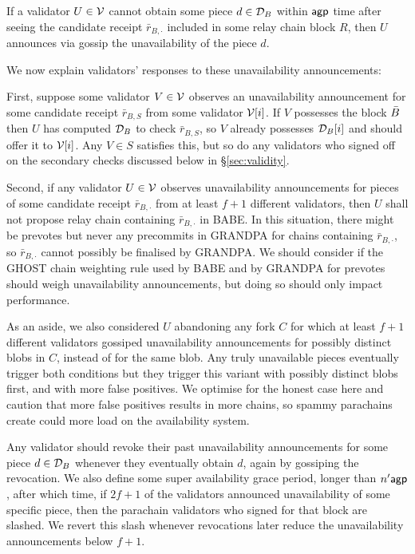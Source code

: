If a validator $U \in \mathcal{V}$ cannot obtain some piece $d \in \mathcal{D}_B$ within $\mathsf{agp}$ time after seeing the candidate receipt $\bar{r}_{B,\cdot}$ included in some relay chain block $R$, then $U$ announces via gossip the unavailability of the piece $d$. 

We now explain validators' responses to these unavailability announcements:

First, suppose some validator $V \in \mathcal{V}$ observes an unavailability announcement for some candidate receipt $\bar{r}_{B,S}$ from some validator $\mathcal{V}[i]$.  If $V$ possesses the block $\bar{B}$ then $U$ has computed $\mathcal{D}_B$ to check $\bar{r}_{B,S}$, so $V$ already possesses $\mathcal{D}_B[i]$ and should offer it to $\mathcal{V}[i]$.  Any $V \in S$ satisfies this, but so do any validators who signed off on the secondary checks discussed below in \S\ref{sec:validity}. 

Second, if any validator $U \in \mathcal{V}$ observes unavailability announcements for pieces of some candidate receipt $\bar{r}_{B,\cdot}$ from at least $f+1$ different validators, then $U$ shall not propose relay chain containing $\bar{r}_{B,\cdot}$ in BABE.
In this situation, there might be prevotes but never any precommits in GRANDPA for chains containing  $\bar{r}_{B,\cdot}$, so $\bar{r}_{B,\cdot}$ cannot possibly be finalised by GRANDPA.  We should consider if the GHOST chain weighting rule used by BABE and by GRANDPA for prevotes should weigh unavailability announcements, but doing so should only impact performance.

As an aside, we also considered $U$ abandoning any fork $C$ for which at least $f+1$ different validators gossiped unavailability announcements for possibly distinct blobs in $C$, instead of for the same blob.  Any truly unavailable pieces eventually trigger both conditions but they trigger this variant with possibly distinct blobs first, and with more false positives.  We optimise for the honest case here and caution that more false positives results in more chains, so spammy parachains create could more load on the availability system.

Any validator should revoke their past unavailability announcements for some piece $d \in \mathcal{D}_B$ whenever they eventually obtain $d$, again by gossiping the revocation.  We also define some super availability grace period, longer than $n' \mathsf{agp}$, after which time, if $2 f + 1$ of the validators announced unavailability of some specific piece, then the parachain validators who signed for that block are slashed.
We revert this slash whenever revocations later reduce the unavailability announcements below $f+1$.










